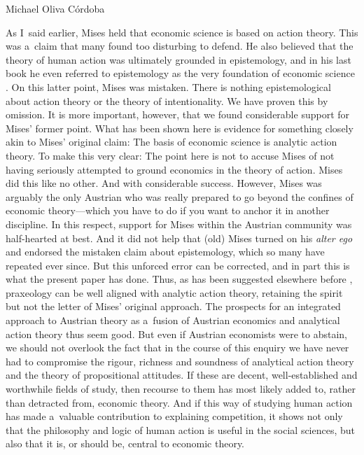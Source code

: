 \begin{artengenv}{Michael Oliva Córdoba}
\begin{enumerate}[label=(\roman*)]
\end{enumerate}

As I~said earlier, Mises held that economic science is based on action theory. This was a~claim that many found too disturbing to defend. He also believed that the theory of human action was ultimately grounded in epistemology, and in his last book he even referred to epistemology as the very foundation of economic science 
\parencite[][]{mises_ultimate_1962}. %
 On this latter point, Mises was mistaken. There is nothing epistemological about action theory or the theory of intentionality. We have proven this by omission. It is more important, however, that we found considerable support for Mises' former point. What has been shown here is evidence for something closely akin to Mises' original claim: The basis of economic science is analytic action theory. To make this very clear: The point here is not to accuse Mises of not having seriously attempted to ground economics in the theory of action. Mises did this like no other. And with considerable success. However, Mises was arguably the only Austrian who was really prepared to go beyond the confines of economic theory---which you have to do if you want to anchor it in another discipline. In this respect, support for Mises within the Austrian community was half-hearted at best. And it did not help that (old) Mises turned on his \textit{alter ego} and endorsed the mistaken claim about epistemology, which so many have repeated ever since. But this unforced error can be corrected, and in part this is what the present paper has done. Thus, as has been suggested elsewhere before 
\parencite[cf.][]{oliva_cordoba_uneasiness_2017}, %
 praxeology can be well aligned with analytic action theory, retaining the spirit but not the letter of Mises' original approach. The prospects for an integrated approach to Austrian theory as a~fusion of Austrian economics and analytical action theory thus seem good. But even if Austrian economists were to abstain, we should not overlook the fact that in the course of this enquiry we have never had to compromise the rigour, richness and soundness of analytical action theory and the theory of propositional attitudes. If these are decent, well-established and worthwhile fields of study, then recourse to them has most likely added to, rather than detracted from, economic theory. And if this way of studying human action has made a~valuable contribution to explaining competition, it shows not only that the philosophy and logic of human action is useful in the social sciences, but also that it is, or should be, central to economic theory.




\end{artengenv}
